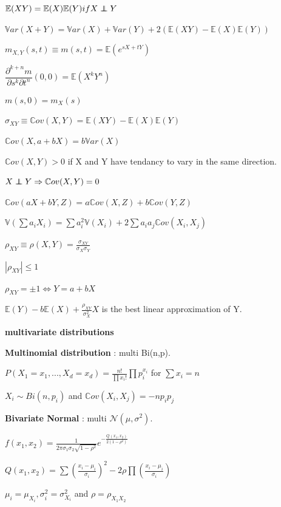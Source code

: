 \documentclass[a4paper,10.5pt]{article}
\newcommand\independent{\protect\mathpalette{\protect\independenT}{\perp}}
\def\independenT#1#2{\mathrel{\rlap{$#1#2$}\mkern2mu{#1#2}}}
\begin{document}
\begin{multicols}{4}
		$\mathbb{E}(XY) = \mathbb{E}(X)\mathbb{E}(Y) if X\independent Y$
		
		$\mathbb{V}ar(X+Y) = \mathbb{V}ar(X) + \mathbb{V}ar(Y) + 2(\mathbb{E}(XY) - \mathbb{E}(X)\mathbb{E}(Y))$
		
		$m_{X,Y}(s,t) \equiv m(s,t) = \mathbb{E}(e^{sX+tY})$
		
		$\dfrac{\partial^{k+n} m}{\partial s^k \partial t^n}(0,0) = \mathbb{E}(X^kY^n)$
		
		$m(s,0) = m_X(s)$
		
		$\sigma_{XY} \equiv \mathbb{C}ov(X,Y) = \mathbb{E}(XY)-\mathbb{E}(X)\mathbb{E}(Y)$
		
		$\mathbb{C}ov(X,a+bX) = b\mathbb{V}ar(X)$
		
		$\mathbb{C}ov(X,Y)>0$ if X and Y have tendancy to vary in the same direction.
		
		$X\independent Y \Rightarrow \mathbb{C}ov(X,Y) = 0$
		
		$\mathbb{C}ov(aX + bY,Z) = a\mathbb{C}ov(X,Z) + b\mathbb{C}ov(Y,Z)$
		
		$\mathbb{V}\left(\sum a_iX_i\right) = \sum a_i^2 \mathbb{V}(X_i) + 2 \sum a_ia_j\mathbb{C}ov(X_i,X_j)$
		
		$\rho_{XY} \equiv \rho(X,Y) = \frac{\sigma_{XY}}{\sigma_X\sigma_Y}$
		
		$|\rho_{XY}|\leq 1$
		
		$\rho_{XY} = \pm 1 \Leftrightarrow Y = a + bX$
		
		$\mathbb{E}(Y) - b\mathbb{E}(X) + \frac{\rho_{XY}}{\sigma_X^2}X$ is the best linear approximation of Y.
		
		\textbf{multivariate distributions}
		
		\textbf{Multinomial distribution} : multi Bi(n,p).
		
		$P(X_1 = x_1, ..., X_d = x_d) = \frac{n!}{\prod x_i !}\prod p_i^{x_i}$ for $\sum x_i = n$
		
		$X_i \sim Bi(n,p_i)$ and $\mathbb{C}ov(X_i,X_j) = -np_ip_j$
		
		\textbf{Bivariate Normal} : multi $\mathcal{N}(\mu,\sigma^2)$.
		
		$f(x_1,x_2) = \frac{1}{2\pi\sigma_1\sigma_2\sqrt{1-\rho^2}}e^{-\frac{Q(x_1,x_2)}{2(1-\rho^2)}}$
		
		$Q(x_1,x_2) = \sum \left(\frac{x_i-\mu_i}{\sigma_i}\right)^2 - 2\rho\prod \left(\frac{x_i-\mu_i}{\sigma_i}\right)$
		
		$\mu_i = \mu_{X_i}, \sigma_i^2 = \sigma_{X_i}^2$ and $\rho = \rho_{X_1X_2}$
		

\end{multicols}
\end{document}
